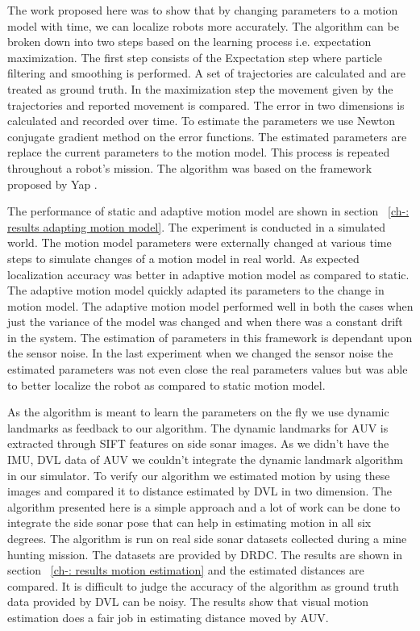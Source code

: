 \documentclass[12pt]{dalcsthesis}
\begin{document}
The work proposed here was to show that by changing parameters to a motion model with time, we can localize robots more accurately. The algorithm can be broken down into two steps based on the learning process i.e. expectation maximization.  The first step consists of the Expectation step where particle filtering and smoothing is performed. A set of trajectories are calculated and are treated as ground truth. In the maximization step the movement given by the trajectories and reported movement is compared. The error in two dimensions is calculated and recorded over time. To estimate the parameters we use Newton conjugate gradient method on the error functions. The estimated parameters are replace the current parameters to the motion model. This process is repeated throughout a robot's mission. The algorithm was based on the framework proposed by Yap \cite{Yapp2008}. 

The performance of static and adaptive motion model are shown in section ~\ref{ch-: results adapting motion model}. The experiment is conducted in a simulated world. The motion model parameters were externally changed at various time steps to simulate changes of a motion model in real world. As expected localization accuracy was better in adaptive motion model as compared to static. The adaptive motion model quickly adapted its parameters to the change in motion model. The adaptive motion model performed well in both the cases when just the variance of the model was changed and when there was a constant drift in the system. The estimation of parameters in this framework is dependant upon the sensor noise. In the last experiment when we changed the sensor noise the estimated parameters was not even close the real parameters values but was able to better localize the robot as compared to static motion model.

As the algorithm is meant to learn the parameters on the fly we use dynamic landmarks as feedback to our algorithm. The dynamic landmarks for AUV is extracted through SIFT features on side sonar images. As we didn't have the IMU, DVL data of AUV we couldn't integrate the dynamic landmark algorithm in our simulator. To verify our algorithm we estimated motion by using these images and compared it to distance estimated by DVL in two dimension. The algorithm presented here is a simple approach and a lot of work can be done to integrate the side sonar pose that can help in estimating motion in all six degrees. The algorithm is run on real side sonar datasets collected during a mine hunting mission. The datasets are provided by DRDC. The results are shown in section ~\ref{ch-: results motion estimation} and the estimated distances are compared. It is difficult to judge the accuracy of the algorithm as ground truth data provided by DVL can be noisy.  The results show that visual motion estimation does a fair job in estimating distance moved by AUV. 
\end{document}
